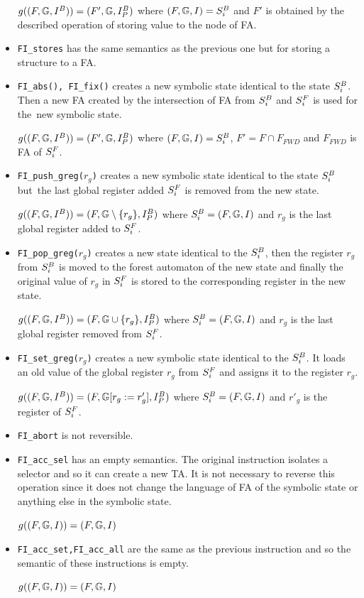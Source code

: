 \begin{itemize}
		$g((F, \mathbb{G}, I^{B})) = (F', \mathbb{G}, I^{B}_{P})$
			where $(F, \mathbb{G}, I) = S^{B}_{i}$ and $F'$ is obtained
			by the described operation of storing value to the node of FA.

	
	\item {\tt FI\_stores}
		has the same semantics as the previous one but for
		storing a structure to a FA.

	\item {\tt FI\_abs(), FI\_fix()}
		creates a new symbolic state identical to the state $S^{B}_{i}$.
		Then a new FA created by the intersection of FA from $S^{B}_{i}$ and $S^{F}_{i}$ is used
		for the~new symbolic state.

		$g((F, \mathbb{G}, I^{B})) = (F', \mathbb{G}, I^{B}_{P})$
			where $(F, \mathbb{G}, I) = S^{B}_{i}$, $F' = F \cap F_{\mathit{FWD}}$ and $F_{\mathit{FWD}}$ is
			FA of $S^{F}_{i}$.

	\item {\tt FI\_push\_greg($r_g$)}
		creates a new symbolic state identical to the state $S^{B}_{i}$ but~the
		last global register added $S^{F}_{i}$ is removed from the new state.

		$g((F, \mathbb{G}, I^{B})) = (F, \mathbb{G} \setminus \{r_g\}, I^{B}_{P})$ where $S^{B}_{i} = (F, \mathbb{G}, I)$ and $r_g$
		is the last global register added to $S^{F}_{i}$.

	\item {\tt FI\_pop\_greg($r_g$)}
		creates a new state identical to the $S^{B}_{i}$,
		then the register $r_g$ from $S^{B}_{i}$ is moved to the
		forest automaton of the new state
		and finally the original value of $r_g$ in $S^{F}_{i}$ is stored
		to the corresponding register in the new state.
	
		$g((F, \mathbb{G}, I^{B})) = (F, \mathbb{G} \cup \{r_g\}, I^{B}_{P})$ where $S^{B}_{i} = (F, \mathbb{G}, I)$ and $r_g$
		is the last global register removed from $S^{F}_{i}$.
	
	\item {\tt FI\_set\_greg($r_g$)}
		creates a new symbolic state identical to the $S^{B}_{i}$.
		It loads an old value of the global register $r_g$ from $S^{F}_{i}$
		and assigns it to the register $r_g$.

		$g((F, \mathbb{G}, I^{B})) = (F, \mathbb{G} [r_{g} := r'_{g}]
		, I^{B}_{P})$ where $S^{B}_{i} = (F, \mathbb{G}, I)$ and $r'_{g}$
		is the register of $S^{F}_{i}$.

	\item {\tt FI\_abort}
		is not reversible.

	\item {\tt FI\_acc\_sel}
		has an empty semantics.
		The original instruction isolates a selector
		and so it can create a new TA.
		It is not necessary to reverse this operation
		since it does not change the language of FA of the
		symbolic state or anything else in the symbolic state.
		
		$g((F, \mathbb{G}, I)) = (F, \mathbb{G}, I)$

	\item {\tt FI\_acc\_set,FI\_acc\_all}
		are the same as the previous instruction and so
		the semantic of these instructions is empty.
		
		$g((F, \mathbb{G}, I)) = (F, \mathbb{G}, I)$

\end{itemize}


